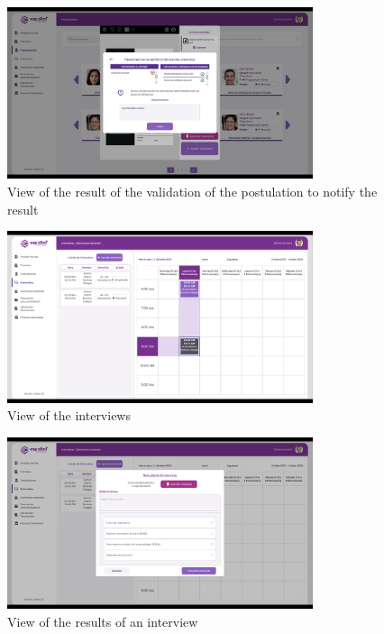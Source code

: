 \documentclass{scrreprt}
\begin{document}
\begin{figure}[H]
	\centering \small
	\includegraphics[width=0.8\textwidth]{WebPrototype/wflow-28.jpeg}
	\caption{View of the result of the validation of the postulation to notify the result}
\end{figure}

\begin{figure}[H]
	\centering \small
	\includegraphics[width=0.8\textwidth]{WebPrototype/wflow-29.jpeg}
	\caption{View of the interviews}
\end{figure}

\begin{figure}[H]
	\centering \small
	\includegraphics[width=0.8\textwidth]{WebPrototype/wflow-30.jpeg}
	\caption{View of the results of an interview}
\end{figure}
\end{document}
